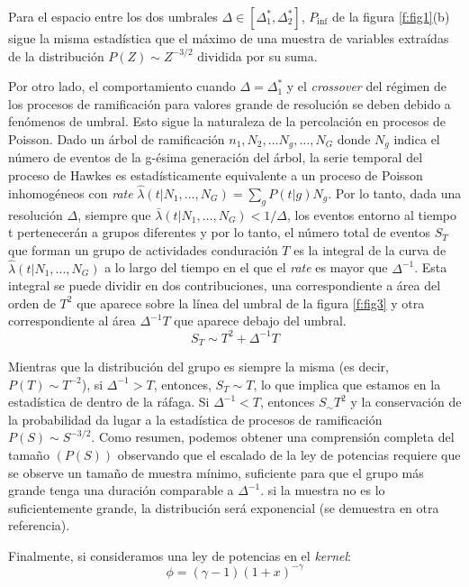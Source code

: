 \documentclass[a4paper,11pt]{book}
\begin{document}
Para el espacio entre los dos umbrales $\Delta\in\left[ \Delta^*_1,\Delta^*_2 \right]$, $P_{\inf}$ de la figura \ref{f:fig1}(b) sigue la misma estadística 
que el máximo de una muestra de variables extraídas de la distribución $P(Z)\sim Z^{-3/2}$ dividida por su suma.

Por otro lado, el comportamiento cuando $\Delta=\Delta^*_1$ y el \textit{crossover} del régimen de los procesos de ramificación para valores grande de 
resolución se deben debido a fenómenos de umbral. Esto sigue la naturaleza de la percolación en procesos de Poisson. Dado un árbol de ramificación 
${n_1,N_2,\ldots N_g,\ldots,N_G}$ donde $N_g$ indica el número de eventos de la g-ésima generación del árbol, la serie temporal del proceso de 
Hawkes es estadísticamente equivalente a un proceso de Poisson inhomogéneos con \textit{rate} $\hat{\lambda}(t|N_1,\ldots,N_G)=\sum_gP(t|g)N_g$.
Por lo tanto, dada una resolución $\Delta$, siempre que $\bar{\lambda}(t|N_1,\ldots,N_G)<1/\Delta$, los eventos entorno al tiempo t 
pertenecerán a grupos diferentes y por lo tanto, el número total de eventos $S_T$ que forman un grupo de actividades conduración $T$ es la integral de 
la curva de $\hat{\lambda}(t|N_1,\ldots,N_G)$ a lo largo del tiempo en el que el \textit{rate} es mayor que $\Delta^{-1}$. Esta integral se puede 
dividir en dos contribuciones, una correspondiente a área del orden de $T^2$ que aparece sobre la línea del umbral de la figura \ref{f:fig3} y otra 
correspondiente al área $\Delta^{-1}T$ que aparece debajo del umbral.
\begin{equation}
    S_T\sim T^2+\Delta^{-1}T
    \label{eq:eq2}
\end{equation}

Mientras que la distribución del grupo es siempre la misma (es decir, $P(T)\sim T^{-2}$), si $\Delta^{-1}>T$, entonces, $S_T\sim T$, lo que implica 
que estamos en la estadística de dentro de la ráfaga. Si $\Delta^{-1}<T$, entonces $S_\sim T^2$ y la conservación de la probabilidad da lugar a la estadística 
de procesos de ramificación $P(S)\sim S^{-3/2}$. Como resumen, podemos obtener una comprensión completa del tamaño $(P(S))$ observando que el escalado de 
la ley de potencias requiere que se observe un tamaño de muestra mínimo, suficiente para que el grupo más grande tenga una duración comparable a $\Delta^{-1}$.
si la muestra no es lo suficientemente grande, la distribución será exponencial (se demuestra en otra referencia).


Finalmente, si consideramos una ley de potencias en el \textit{kernel}:
$$\phi=(\gamma-1)(1+x)^{-\gamma}$$
\end{document}
